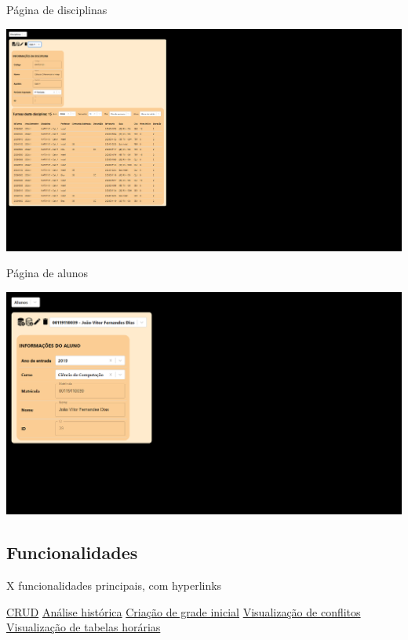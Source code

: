 \begin{MyCenteredFigure} \caption{Página de disciplinas} \label{fig:disciplinas}
  \includegraphics[width=\textwidth]{files/img/2.02!7-resultados/9-Disciplinas.png}
\end{MyCenteredFigure}

\begin{MyCenteredFigure} \caption{Página de alunos} \label{fig:alunos}
  \includegraphics[width=\textwidth]{files/img/2.02!7-resultados/10-Aluno.png}
\end{MyCenteredFigure}

\subsection{Funcionalidades}

X funcionalidades principais, com hyperlinks

\hyperref[sssec:CRUD]{CRUD}
\hyperref[sssec:Análise histórica]{Análise histórica}
\hyperref[sssec:Criação de grade inicial]{Criação de grade inicial}
\hyperref[sssec:Visualização de conflitos]{Visualização de conflitos}
\hyperref[sssec:Visualização de tabelas horárias]{Visualização de tabelas horárias}


